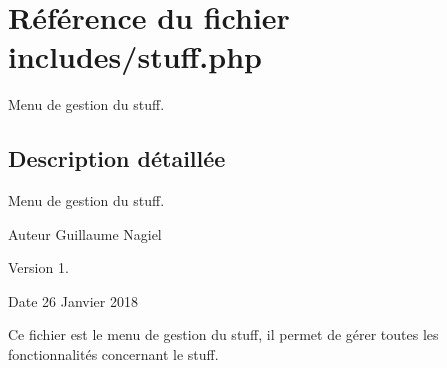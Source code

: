 \hypertarget{includes_2_stuff_8php}{}\section{Référence du fichier includes/stuff.php}
\label{includes_2_stuff_8php}


Menu de gestion du stuff.  




\subsection{Description détaillée}
Menu de gestion du stuff. 

\begin{DoxyAuthor}{Auteur}
Guillaume Nagiel 
\end{DoxyAuthor}
\begin{DoxyVersion}{Version}
1. 
\end{DoxyVersion}
\begin{DoxyDate}{Date}
26 Janvier 2018
\end{DoxyDate}
Ce fichier est le menu de gestion du stuff, il permet de gérer toutes les fonctionnalités concernant le stuff. 